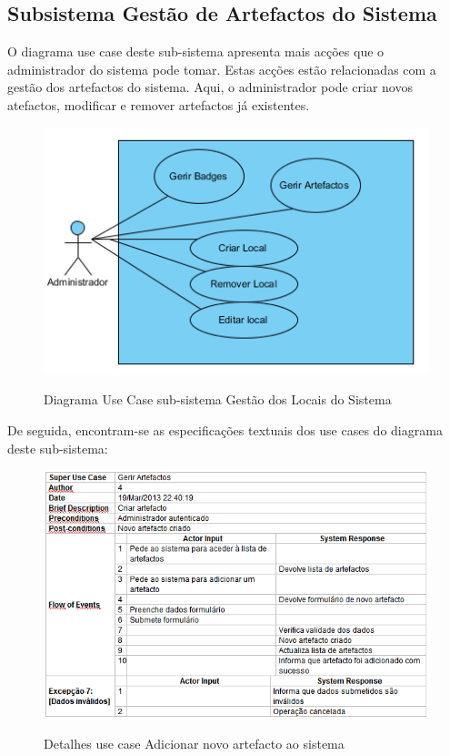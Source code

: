 ﻿\documentclass[12pt,a4paper]{article}
\begin{document}
\clearpage

\subsection{Subsistema Gestão de Artefactos do Sistema}

O diagrama use case deste sub-sistema apresenta mais acções que o administrador do sistema
pode tomar. Estas acções estão relacionadas com a gestão dos artefactos do sistema. Aqui, o
administrador pode criar novos atefactos, modificar e remover artefactos já existentes.\\

\begin{figure}[h!]
\centering
\includegraphics[scale=1]{usecase/A_GerirLocal}
\label{usecase}
\caption{Diagrama Use Case sub-sistema Gestão dos Locais do Sistema}
\end{figure}

De seguida, encontram-se as especificações textuais dos use cases do diagrama deste sub-sistema:\\

\begin{figure}[h!]
\centering
\includegraphics[scale=0.7]{d_usecase/A_criarartefacto}
\label{usecase}
\caption{Detalhes use case Adicionar novo artefacto ao sistema}
\end{figure}
\end{document}
